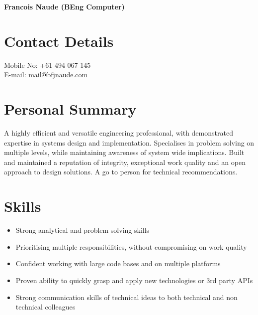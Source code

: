 \documentclass[11pt,a4paper]{article}
\begin{document}
\noindent
{\bfseries\LARGE Francois Naude (BEng Computer)}\\ 

\section*{Contact Details}
{\large
Mobile No: +61 494 067 145\\
E-mail: mail@bfjnaude.com
}
\section*{Personal Summary}
A highly efficient and versatile engineering professional, with demonstrated expertise in
systems design and implementation. Specialises in problem solving on multiple levels, while
maintaining awareness of system wide implications. Built and maintained a reputation of
integrity, exceptional work quality and an open approach to design solutions. A go to person for
technical recommendations.

\section*{Skills}
\begin{itemize}
	\item Strong analytical and problem solving skills
	\item Prioritising multiple responsibilities, without compromising on work quality
	\item Confident working with large code bases and on multiple platforms
	\item Proven ability to quickly grasp and apply new technologies or 3rd party APIs
	\item Strong communication skills of technical ideas to both technical and non technical colleagues 
\end{itemize}
\end{document}
